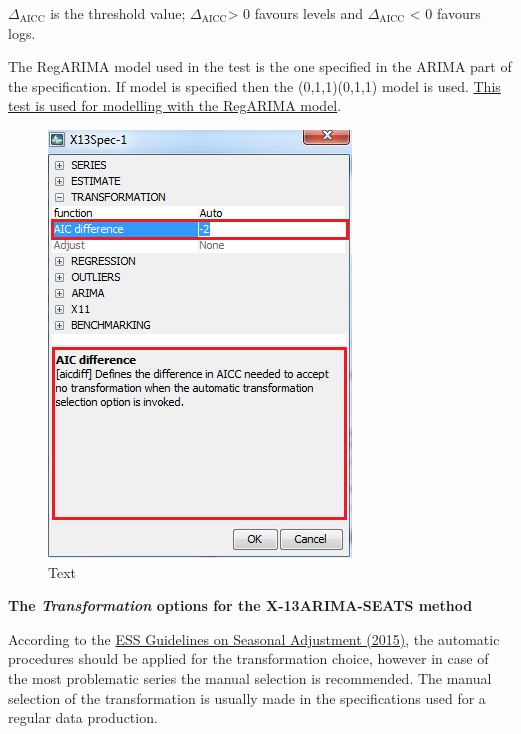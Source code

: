 \documentclass[
  letterpaper,
  DIV=11,
  numbers=noendperiod]{scrreprt}
\begin{document}
\(\Delta_{\text{AICC}}\) is the threshold value;
\(\Delta_{\text{AICC}}\)\textgreater{} 0 favours levels and
\(\Delta_{\text{AICC}}\) \textless{} 0 favours logs.

The RegARIMA model used in the test is the one specified in the ARIMA
part of the specification. If model is specified then the (0,1,1)(0,1,1)
model is used. \protect\hyperlink{transformation}{This test is used for
modelling with the RegARIMA model}.

\begin{figure}

{\centering \includegraphics{./All_images/UG_SA_image38.jpg}

}

\caption{Text}

\end{figure}

\textbf{The \emph{Transformation} options for the X-13ARIMA-SEATS
method}

According to the
\href{https://ec.europa.eu/eurostat/documents/3859598/6830795/KS-GQ-15-001-EN-N.pdf/d8f1e5f5-251b-4a69-93e3-079031b74bd3}{ESS
Guidelines on Seasonal Adjustment (2015)}, the automatic procedures
should be applied for the transformation choice, however in case of the
most problematic series the manual selection is recommended. The manual
selection of the transformation is usually made in the specifications
used for a regular data production.
\end{document}
